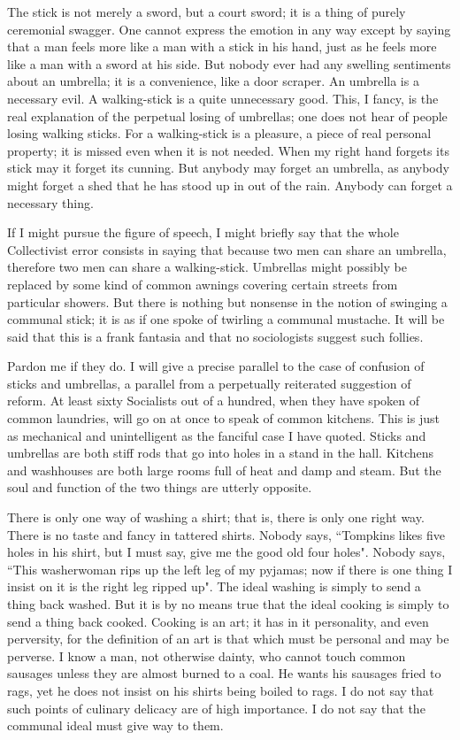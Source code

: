\documentclass[final,10pt,letterpaper,twocolumn,openany]{book}
\begin{document}
The stick is not merely a sword, but a
court sword; it is a thing of purely ceremonial swagger. One cannot
express the emotion in any way except by saying that a man feels more
like a man with a stick in his hand, just as he feels more like a man with a
sword at his side. But nobody ever had any swelling sentiments about an
umbrella; it is a convenience, like a door scraper. An umbrella is a
necessary evil. A walking-stick is a quite unnecessary good. This, I fancy,
is the real explanation of the perpetual losing of umbrellas; one does not
hear of people losing walking sticks. For a walking-stick is a pleasure, a
piece of real personal property; it is missed even when it is not needed.
When my right hand forgets its stick may it forget its cunning. But
anybody may forget an umbrella, as anybody might forget a shed that he
has stood up in out of the rain. Anybody can forget a necessary thing.

If I might pursue the figure of speech, I might briefly say that the
whole Collectivist error consists in saying that because two men can share
an umbrella, therefore two men can share a walking-stick. Umbrellas
might possibly be replaced by some kind of common awnings covering
certain streets from particular showers. But there is nothing but nonsense
in the notion of swinging a communal stick; it is as if one spoke of
twirling a communal mustache. It will be said that this is a frank fantasia
and that no sociologists suggest such follies. 

Pardon me if they do. I will
give a precise parallel to the case of confusion of sticks and umbrellas, a
parallel from a perpetually reiterated suggestion of reform. At least sixty
Socialists out of a hundred, when they have spoken of common laundries,
will go on at once to speak of common kitchens. This is just as mechanical
and unintelligent as the fanciful case I have quoted. Sticks and umbrellas
are both stiff rods that go into holes in a stand in the hall. Kitchens and
washhouses are both large rooms full of heat and damp and steam. But the
soul and function of the two things are utterly opposite. 

There is only one
way of washing a shirt; that is, there is only one right way. There is no
taste and fancy in tattered shirts. Nobody says, ``Tompkins likes five holes
in his shirt, but I must say, give me the good old four holes". Nobody says,
``This washerwoman rips up the left leg of my pyjamas; now if there is one
thing I insist on it is the right leg ripped up". The ideal washing is simply
to send a thing back washed. But it is by no means true that the ideal
cooking is simply to send a thing back cooked. Cooking is an art; it has in
it personality, and even perversity, for the definition of an art is that which
must be personal and may be perverse. I know a man, not otherwise dainty,
who cannot touch common sausages unless they are almost burned to a
coal. He wants his sausages fried to rags, yet he does not insist on his
shirts being boiled to rags. I do not say that such points of culinary
delicacy are of high importance. I do not say that the communal ideal must
give way to them.
\end{document}
